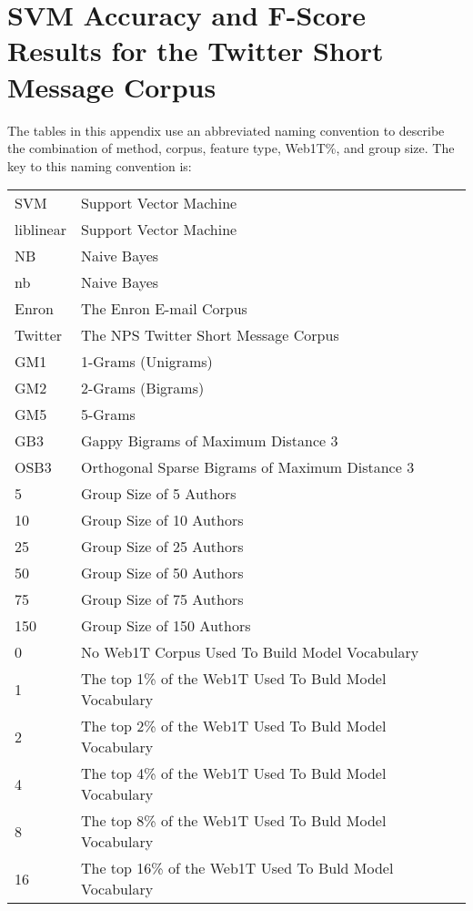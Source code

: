 \chapter{SVM Accuracy and F-Score Results for the Twitter Short Message Corpus}

The tables in this appendix use an abbreviated naming convention to describe the combination of method, corpus, feature type, Web1T\%, and group size.  The key to this naming convention is:

\begin{center}
\begin{table}[htbp!]
	\begin{center}
	\begin{tabular}{ll}
	SVM & Support Vector Machine\\
	liblinear & Support Vector Machine\\
	NB & Naive Bayes\\
	nb & Naive Bayes\\
	
	Enron & The Enron E-mail Corpus\\
	Twitter & The NPS Twitter Short Message Corpus\\
	
	GM1 & 1-Grams (Unigrams)\\
	GM2 & 2-Grams (Bigrams)\\
	GM5 & 5-Grams\\
	GB3 & Gappy Bigrams of Maximum Distance 3\\
	OSB3 & Orthogonal Sparse Bigrams of Maximum Distance 3\\
		
	5 & Group Size of 5 Authors\\
	10 & Group Size of 10 Authors\\
	25 & Group Size of 25 Authors\\
	50 & Group Size of 50 Authors\\
	75 & Group Size of 75 Authors\\
	150 & Group Size of 150 Authors\\
	
	0 & No Web1T Corpus Used To Build Model Vocabulary\\
	1 & The top 1\% of the Web1T Used To Buld Model Vocabulary\\
	2 & The top 2\% of the Web1T Used To Buld Model Vocabulary\\
	4 & The top 4\% of the Web1T Used To Buld Model Vocabulary\\
	8 & The top 8\% of the Web1T Used To Buld Model Vocabulary\\
	16 & The top 16\% of the Web1T Used To Buld Model Vocabulary\\
	\end{tabular}
	\end{center}
\end{table}
\end{center}


